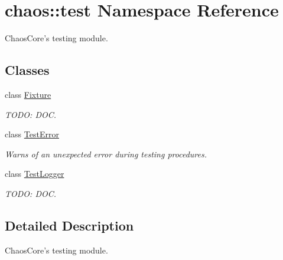 \hypertarget{namespacechaos_1_1test}{\section{chaos\-:\-:test Namespace Reference}
\label{namespacechaos_1_1test}
}


Chaos\-Core's testing module.  


\subsection*{Classes}
\begin{DoxyCompactItemize}
\item 
class \hyperlink{classchaos_1_1test_1_1_fixture}{Fixture}
\begin{DoxyCompactList}\small\item\em T\-O\-D\-O\-: D\-O\-C. \end{DoxyCompactList}\item 
class \hyperlink{classchaos_1_1test_1_1_test_error}{Test\-Error}
\begin{DoxyCompactList}\small\item\em Warns of an unexpected error during testing procedures. \end{DoxyCompactList}\item 
class \hyperlink{classchaos_1_1test_1_1_test_logger}{Test\-Logger}
\begin{DoxyCompactList}\small\item\em T\-O\-D\-O\-: D\-O\-C. \end{DoxyCompactList}\end{DoxyCompactItemize}


\subsection{Detailed Description}
Chaos\-Core's testing module. 